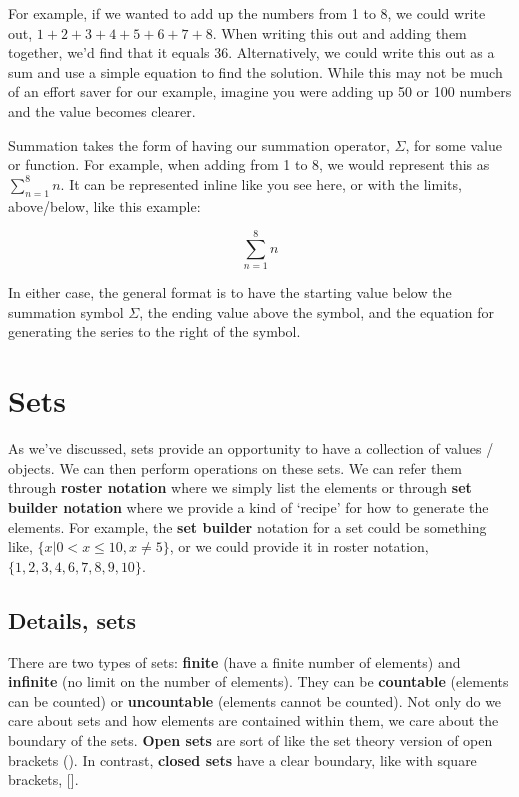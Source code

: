 \documentclass[
]{book}
\begin{document}
For example, if we wanted to add up the numbers from 1 to 8, we could write out, \(1+2+3+4+5+6+7+8\). When writing this out and adding them together, we'd find that it equals 36. Alternatively, we could write this out as a sum and use a simple equation to find the solution. While this may not be much of an effort saver for our example, imagine you were adding up 50 or 100 numbers and the value becomes clearer.

Summation takes the form of having our summation operator, \(\Sigma\), for some value or function. For example, when adding from 1 to 8, we would represent this as \(\sum_{n=1}^{8} n\). It can be represented inline like you see here, or with the limits, above/below, like this example:

\begin{equation}
\sum_{n=1}^{8} n
\end{equation}

In either case, the general format is to have the starting value below the summation symbol \(\Sigma\), the ending value above the symbol, and the equation for generating the series to the right of the symbol.

\hypertarget{sets}{%
\section{Sets}\label{sets}}

As we've discussed, sets provide an opportunity to have a collection of values / objects. We can then perform operations on these sets. We can refer them through \textbf{roster notation} where we simply list the elements or through \textbf{set builder notation} where we provide a kind of `recipe' for how to generate the elements. For example, the \textbf{set builder} notation for a set could be something like, \(\{x| 0<x\leq10, x \neq 5\}\), or we could provide it in roster notation, \(\{1, 2, 3, 4, 6, 7, 8, 9, 10 \}\).

\hypertarget{details-sets}{%
\subsection{Details, sets}\label{details-sets}}

There are two types of sets: \textbf{finite} (have a finite number of elements) and \textbf{infinite} (no limit on the number of elements). They can be \textbf{countable} (elements can be counted) or \textbf{uncountable} (elements cannot be counted). Not only do we care about sets and how elements are contained within them, we care about the boundary of the sets. \textbf{Open sets} are sort of like the set theory version of open brackets (). In contrast, \textbf{closed sets} have a clear boundary, like with square brackets, {[}{]}.
\end{document}
